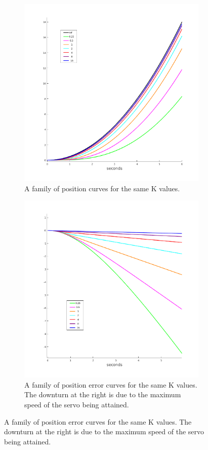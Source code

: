 \documentclass[11pt,a4paper]{article}
\begin{document}
\begin{enumerate}
\begin{figure}[!htbp]
	\centering
	\begin{subfigure}{.5\textwidth}
		\centering
		\includegraphics[width = \textwidth]{imglab/lab4sol_paraposkfam.png}
		\caption{A family of position curves for the same K values.}
	\end{subfigure}%
	\begin{subfigure}{.5\textwidth}
		\centering
		\includegraphics[width = \textwidth]{imglab/lab4sol_paraposerr.png}
		\caption{A family of position error curves for the same K values. The downturn at the right is due to the maximum speed of the servo being attained.}	
	\end{subfigure}
\end{figure}


\end{enumerate}
\end{document}
